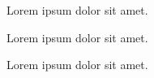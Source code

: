 \documentclass{article}
\begin{document}
\beginnumbering
Lorem ipsum dolor sit amet.
\endnumbering
\begin{pairs}
  \begin{Leftside}
    \beginnumbering
    Lorem ipsum dolor sit amet.
    \endnumbering
  \end{Leftside}
  \begin{Rightside}
    \beginnumbering
    Lorem ipsum dolor sit amet.
    \endnumbering
  \end{Rightside}
\end{pairs}
\Columns
\end{document}
